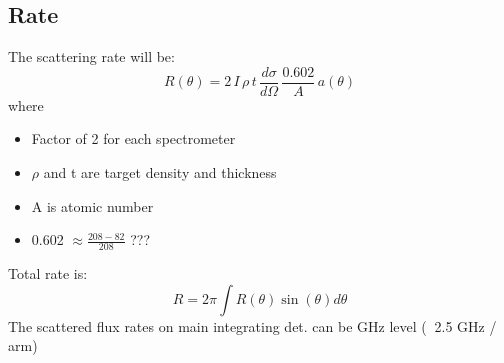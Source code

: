 \subsection{Rate}
The scattering rate will be:
\begin{equation*}
    R(\theta) = 2\,I\,\rho\,t\,\frac{d\sigma}{d\Omega}\,\frac{0.602}{A}\,a(\theta)
\end{equation*}
where
\begin{itemize}
    \item Factor of 2 for each spectrometer
    \item $\rho$ and t are target density and thickness
    \item A is atomic number
    \item 0.602 $\approx \frac{208-82}{208}$ ???
\end{itemize}
Total rate is:
\begin{equation*}
    R = 2\pi \int R(\theta)\sin(\theta)d\theta
\end{equation*}
The scattered flux rates on main integrating det. can be GHz level ($~$ 2.5 GHz / arm)




\begin{comment}
    The measured asymmetry will be:
    \begin{equation*}
	\CA = \frac{2\pi}{R} \int \CA_0(\theta)R(\theta)d\theta
    \end{equation*}

    Define sensitivity as:
    \begin{equation*}
	S(\theta) = \frac{|\CA_0(\theta) - \CA_1(\theta)|}{\CA_0(\theta)}
    \end{equation*}
    where $\CA_1$ is the asym. for 1\% change in radius. Then we can 
    calculate the total sensitivity:
    \begin{equation*}
	S = \frac{2\pi}{R} \int S(\theta)R(\theta)d\theta
    \end{equation*}

    For PREX-II: average sensitivity reduced by 5\% due to ${}^{12}C$ contamination
    For CREX: average sensitivity reduced by 10\% due to ${}^{40}Ca$ contamination
\end{comment}


